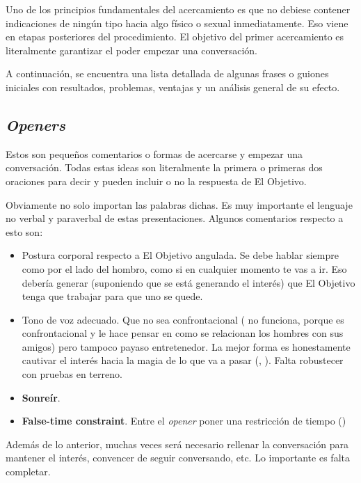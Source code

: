 \documentclass{article}
\begin{document}
Uno de los principios fundamentales del acercamiento es que no debiese contener indicaciones de ningún tipo hacia algo físico o sexual inmediatamente. Eso viene en etapas posteriores del procedimiento. El objetivo del primer acercamiento es literalmente garantizar el poder empezar una conversación.

A continuación, se encuentra una lista detallada de algunas frases o guiones iniciales con resultados, problemas, ventajas y un análisis general de su efecto.

\subsection{\textit{Openers}\label{ssec:openers}}
Estos son pequeños comentarios o formas de acercarse y empezar una conversación. Todas estas ideas son literalmente la primera o primeras dos oraciones para decir y pueden incluir o no la respuesta de El Objetivo.

Obviamente no solo importan las palabras dichas. Es muy importante el lenguaje no verbal y paraverbal de estas presentaciones. Algunos comentarios respecto a esto son:
\begin{itemize}
\item Postura corporal respecto a El Objetivo angulada. Se debe hablar siempre como por el lado del hombro, como si en cualquier momento te vas a ir. Eso debería generar (suponiendo que se está generando el interés) que El Objetivo tenga que trabajar para que uno se quede.
\item Tono de voz adecuado. Que no sea confrontacional ( no funciona, porque es confrontacional y le hace pensar en como se relacionan los hombres con sus amigos) pero tampoco payaso entretenedor. La mejor forma es honestamente cautivar el interés hacia la magia de lo que va a pasar (, ). {\color{red} Falta robustecer con pruebas en terreno}.
\item \textbf{Sonreír}.
\item \textbf{False-time constraint}. Entre el \textit{opener} poner una restricción de tiempo ()
\end{itemize}

Además de lo anterior, muchas veces será necesario rellenar la conversación para mantener el interés, convencer de seguir conversando, etc. Lo importante es {\color{red} falta completar}.
\end{document}
